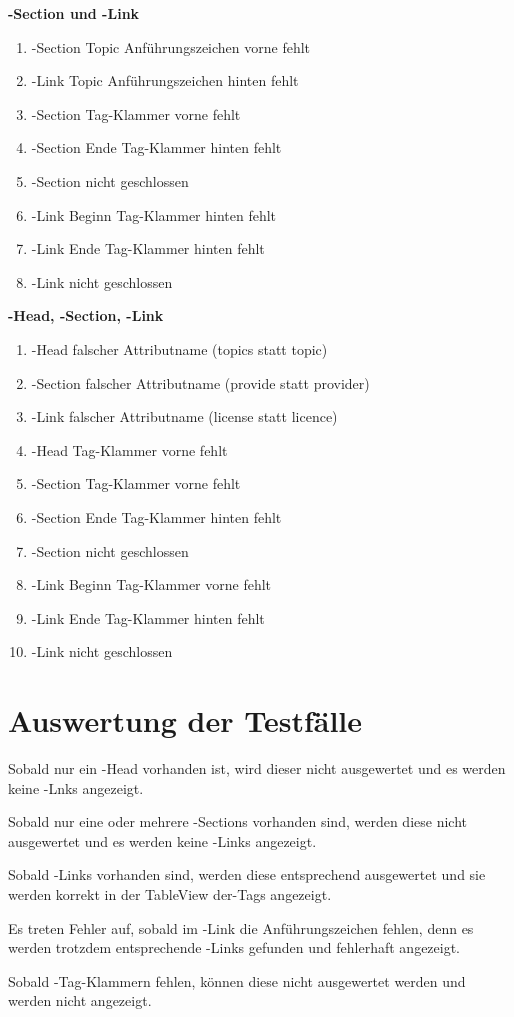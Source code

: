 \textbf{\SEARCH-Section und \SEARCH-Link} 
\begin{enumerate}
\item \SEARCH-Section Topic Anführungszeichen vorne fehlt
\item \SEARCH-Link Topic Anführungszeichen hinten fehlt
\item \SEARCH-Section Tag-Klammer vorne fehlt
\item \SEARCH-Section Ende  Tag-Klammer hinten fehlt
\item \SEARCH-Section nicht geschlossen
\item \SEARCH-Link Beginn Tag-Klammer hinten fehlt
\item \SEARCH-Link Ende  Tag-Klammer hinten fehlt
\item \SEARCH-Link nicht geschlossen
\end{enumerate}

\textbf{\SEARCH-Head, \SEARCH-Section, \SEARCH-Link}

\begin{enumerate}
\item \SEARCH-Head falscher Attributname (topics statt topic)
\item \SEARCH-Section falscher Attributname (provide statt provider)
\item \SEARCH-Link falscher Attributname (license statt licence)
\item \SEARCH-Head Tag-Klammer vorne fehlt
\item \SEARCH-Section Tag-Klammer vorne fehlt
\item \SEARCH-Section Ende  Tag-Klammer hinten fehlt
\item \SEARCH-Section nicht geschlossen
\item \SEARCH-Link Beginn Tag-Klammer vorne fehlt
\item \SEARCH-Link Ende  Tag-Klammer hinten fehlt
\item \SEARCH-Link nicht geschlossen
\end{enumerate}

\section{Auswertung der Testfälle}

Sobald nur ein \SEARCH-Head vorhanden ist, wird dieser nicht ausgewertet und es werden keine \SEARCH-Lnks angezeigt.

Sobald nur eine oder mehrere \SEARCH-Sections vorhanden sind, werden diese nicht ausgewertet und es werden keine \SEARCH-Links angezeigt.

Sobald \SEARCH-Links vorhanden sind, werden diese entsprechend ausgewertet und sie werden korrekt in der TableView der\SEARCH-Tags angezeigt.

Es treten Fehler auf, sobald im \SEARCH-Link die Anführungszeichen fehlen, denn es werden trotzdem entsprechende \SEARCH-Links gefunden und fehlerhaft angezeigt.

Sobald \SEARCH-Tag-Klammern fehlen, können diese nicht ausgewertet werden und werden nicht angezeigt.